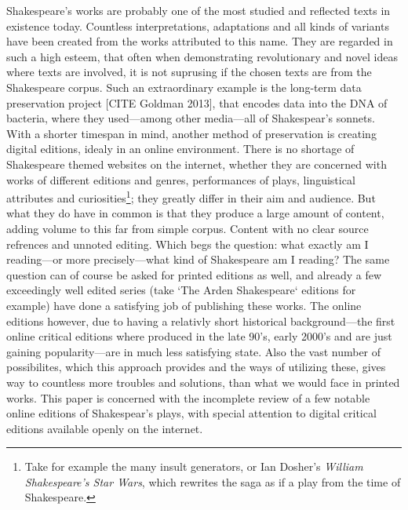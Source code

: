 
Shakespeare's works are probably one of the most studied and reflected texts in existence today. Countless interpretations, adaptations and all kinds of variants have been created from the works attributed to this name. They are regarded in such a high esteem, that often when demonstrating revolutionary and novel ideas where texts are involved, it is not suprusing if the chosen texts are from the Shakespeare corpus. 
Such an extraordinary example is the long-term data preservation project [CITE Goldman 2013], that encodes data into the DNA of bacteria, where they used---among other media---all of Shakespear's sonnets. With a shorter timespan in mind, another method of preservation is creating digital editions, idealy in an online environment. There is no shortage of Shakespeare themed websites on the internet, whether they are concerned with works of different editions and genres, performances of plays, linguistical attributes and curiosities\footnote{Take for example the many insult generators, or Ian Dosher's \textit{William Shakespeare's Star Wars}, which rewrites the saga as if a play from the time of Shakespeare.}; they greatly differ in their aim and audience. 
But what they do have in common is that they produce a large amount of content, adding volume to this far from simple corpus. Content with no clear source refrences and unnoted editing. Which begs the question: what exactly am I reading---or more precisely---what kind of Shakespeare am I reading? The same question can of course be asked for printed editions as well, and already a few exceedingly well edited series (take `The Arden Shakespeare` editions for example) have done a satisfying job of publishing these works. The online editions however, due to having a relativly short historical background---the first online critical editions where produced in the late 90's, early 2000's and are just gaining popularity---are in much less satisfying state. Also the vast number of possibilites, which this approach provides and the ways of utilizing these, gives way to countless more troubles and solutions, than what we would face in printed works. This paper is concerned with the incomplete review of a few notable online editions of Shakespear's plays, with special attention to digital critical editions available openly on the internet.
 
